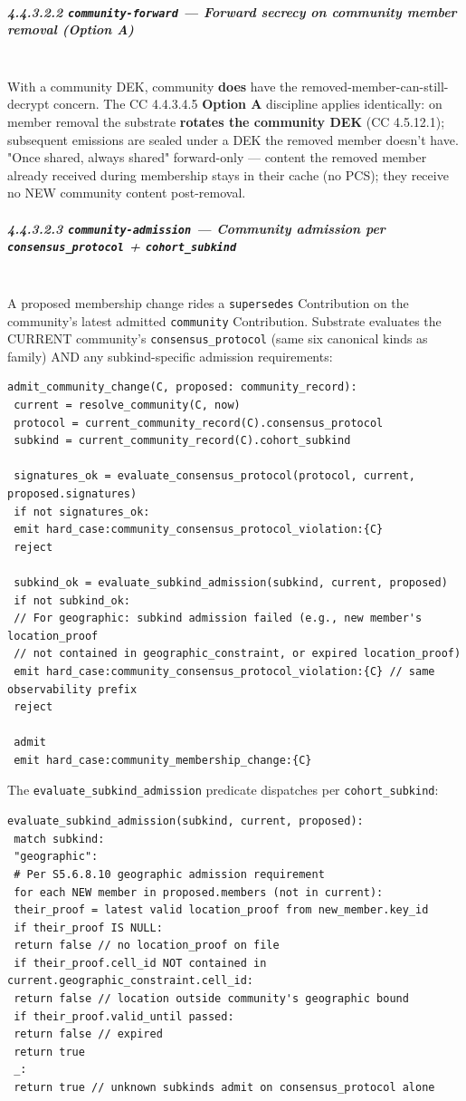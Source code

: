 \documentclass[11pt]{article}
\begin{document}
\subparagraph{4.4.3.2.2 \texttt{community-forward} — Forward secrecy on community member removal (Option A)}\mbox{}\\


With a community DEK, community \textbf{does} have the removed-member-can-still-decrypt concern. The CC 4.4.3.4.5 \textbf{Option A} discipline applies identically: on member removal the substrate \textbf{rotates the community DEK} (CC 4.5.12.1); subsequent emissions are sealed under a DEK the removed member doesn't have. "Once shared, always shared" forward-only — content the removed member already received during membership stays in their cache (no PCS); they receive no NEW community content post-removal.


\subparagraph{4.4.3.2.3 \texttt{community-admission} — Community admission per \texttt{consensus\_protocol} + \texttt{cohort\_subkind}}\mbox{}\\


A proposed membership change rides a \texttt{supersedes} Contribution on the community's latest admitted \texttt{community} Contribution. Substrate evaluates the CURRENT community's \texttt{consensus\_protocol} (same six canonical kinds as family) AND any subkind-specific admission requirements:


\begin{lstlisting}
admit_community_change(C, proposed: community_record):
 current = resolve_community(C, now)
 protocol = current_community_record(C).consensus_protocol
 subkind = current_community_record(C).cohort_subkind

 signatures_ok = evaluate_consensus_protocol(protocol, current, proposed.signatures)
 if not signatures_ok:
 emit hard_case:community_consensus_protocol_violation:{C}
 reject

 subkind_ok = evaluate_subkind_admission(subkind, current, proposed)
 if not subkind_ok:
 // For geographic: subkind admission failed (e.g., new member's location_proof
 // not contained in geographic_constraint, or expired location_proof)
 emit hard_case:community_consensus_protocol_violation:{C} // same observability prefix
 reject

 admit
 emit hard_case:community_membership_change:{C}
\end{lstlisting}

The \texttt{evaluate\_subkind\_admission} predicate dispatches per \texttt{cohort\_subkind}:


\begin{lstlisting}
evaluate_subkind_admission(subkind, current, proposed):
 match subkind:
 "geographic":
 # Per S5.6.8.10 geographic admission requirement
 for each NEW member in proposed.members (not in current):
 their_proof = latest valid location_proof from new_member.key_id
 if their_proof IS NULL:
 return false // no location_proof on file
 if their_proof.cell_id NOT contained in current.geographic_constraint.cell_id:
 return false // location outside community's geographic bound
 if their_proof.valid_until passed:
 return false // expired
 return true
 _:
 return true // unknown subkinds admit on consensus_protocol alone
\end{lstlisting}
\end{document}
